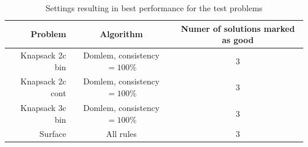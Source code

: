 \begin{table}[h]
  \centering
  \begin{tabular}{r c c}
    \hline
    Problem & Algorithm & Numer of solutions marked as good \\
    \hline
    Knapsack 2c bin & Domlem, consistency $= 100\%$ & 3 \\
    Knapsack 2c cont & Domlem, consistency $= 100\%$ & 3 \\
    Knapsack 3c bin & Domlem, consistency $= 100\%$ & 3 \\
    Surface & All rules & 3 \\
    \hline
  \end{tabular}
  \caption{Settings resulting in best performance for the test problems}
  \label{t:best1_conf}
\end{table} 


